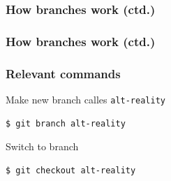 \documentclass[12pt]{beamer}
\begin{document}
\begin{frame}
  \frametitle{How branches work (ctd.)}

\end{frame}

\begin{frame}
  \frametitle{How branches work (ctd.)}

\end{frame}

\begin{frame}[fragile]
  \frametitle{Relevant commands}

  \begin{block}{Make new branch calles \texttt{alt-reality}}
    {\footnotesize{}%
      \begin{verbatim}
$ git branch alt-reality
      \end{verbatim}%
    }
  \end{block}

  \begin{block}{Switch to branch}
    {\footnotesize{}%
      \begin{verbatim}
$ git checkout alt-reality
      \end{verbatim}%
    }
  \end{block}
\end{frame}
\end{document}
